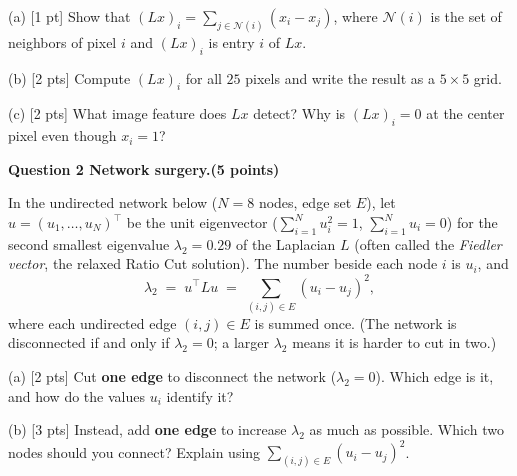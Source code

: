 \documentclass[a4paper, 11pt]{extarticle}
\renewcommand{\question}[3]{%
  \vspace{0.45em}
  {\large\bfseries Question #1 \quad #3\quad\normalsize\mdseries (#2 points)}\par
  \vspace{-0.4em}{\color{rulegrey}\rule{\textwidth}{0.6pt}}\par}
\begin{document}
\medskip
(a) [1 pt] Show that $(Lx)_i = \sum_{j \in \mathcal{N}(i)} (x_i - x_j)$, where
$\mathcal{N}(i)$ is the set of neighbors of pixel $i$ and $(Lx)_i$ is entry $i$
of $Lx$.

\smallskip
(b) [2 pts] Compute $(Lx)_i$ for all $25$ pixels and write the result as a
$5 \times 5$ grid.

\smallskip
(c) [2 pts] What image feature does $Lx$ detect? Why is $(Lx)_i = 0$ at the
center pixel even though $x_i = 1$?

\vspace{0.3em}
\question{2}{5}{Network surgery.}

In the undirected network below ($N = 8$ nodes, edge set $E$), let
$u = (u_1,\dots,u_N)^\top$ be the unit eigenvector ($\sum_{i=1}^N u_i^2 = 1$,
$\sum_{i=1}^N u_i = 0$) for the second smallest eigenvalue $\lambda_2 = 0.29$ of
the Laplacian $L$ (often called the \emph{Fiedler vector}, the relaxed Ratio Cut
solution). The number beside each node $i$ is $u_i$, and
\[
  \lambda_2 \;=\; u^\top L u \;=\; \sum_{(i,j)\in E} (u_i - u_j)^2 ,
\]
where each undirected edge $(i,j) \in E$ is summed once. (The network is
disconnected if and only if $\lambda_2 = 0$; a larger $\lambda_2$ means it is
harder to cut in two.)

\begin{center}
\vspace{-0.3em}
\vspace{-0.3em}
\end{center}

(a) [2 pts] Cut \textbf{one edge} to disconnect the network ($\lambda_2 = 0$).
Which edge is it, and how do the values $u_i$ identify it?

\smallskip
(b) [3 pts] Instead, add \textbf{one edge} to increase $\lambda_2$ as much as
possible. Which two nodes should you connect? Explain using
$\sum_{(i,j)\in E}(u_i - u_j)^2$.
\end{document}
